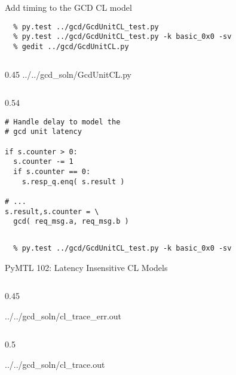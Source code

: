 \begin{task}\begin{frame}[fragile]{Add timing to the GCD CL model}
\vspace{-0.2in}
\begin{Verbatim}[commandchars=\\\{\}]
  % cd    \midtilde/pymtl-tut/build
  % py.test ../gcd/GcdUnitCL_test.py
  % py.test ../gcd/GcdUnitCL_test.py -k basic_0x0 -sv
  % gedit ../gcd/GcdUnitCL.py
\end{Verbatim}

  \begin{cbxcols}
  \begin{column}{0.45\tw}
%
{../../gcd_soln/GcdUnitCL.py}
  \end{column}
  \begin{column}{0.54\tw}
\begin{lstlisting}[numbers=none]
# Handle delay to model the
# gcd unit latency

if s.counter > 0:
  s.counter -= 1
  if s.counter == 0:
    s.resp_q.enq( s.result )

# ...
s.result,s.counter = \
  gcd( req_msg.a, req_msg.b )
\end{lstlisting}
  \end{column}
  \end{cbxcols}

\vspace{-.2in}
\begin{verbatim}
  % py.test ../gcd/GcdUnitCL_test.py -k basic_0x0 -sv
\end{verbatim}
\end{frame}
\end{task}

\begin{frame}{PyMTL 102: Latency Insensitive CL Models}
\vspace{-0.25in}

  \begin{cbxcols}
  \begin{column}{0.45\tw}

%
{../../gcd_soln/cl_trace_err.out}

  \end{column}
  \begin{column}{0.5\tw}

%
{../../gcd_soln/cl_trace.out}

  \end{column}
  \end{cbxcols}

\end{frame}

